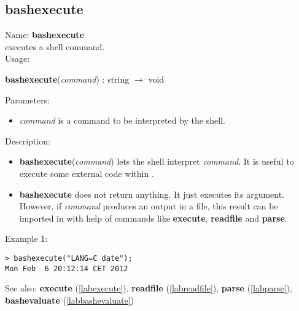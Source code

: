 \subsection{bashexecute}
\label{labbashexecute}
\noindent Name: \textbf{bashexecute}\\
executes a shell command.\\
\noindent Usage: 
\begin{center}
\textbf{bashexecute}(\emph{command}) : \textsf{string} $\rightarrow$ \textsf{void}\\
\end{center}
Parameters: 
\begin{itemize}
\item \emph{command} is a command to be interpreted by the shell.
\end{itemize}
\noindent Description: \begin{itemize}

\item \textbf{bashexecute}(\emph{command}) lets the shell interpret \emph{command}. It is useful to execute
   some external code within \sollya.

\item \textbf{bashexecute} does not return anything. It just executes its argument. However, if
   \emph{command} produces an output in a file, this result can be imported in \sollya
   with help of commands like \textbf{execute}, \textbf{readfile} and \textbf{parse}.
\end{itemize}
\noindent Example 1: 
\begin{center}\begin{minipage}{15cm}\begin{Verbatim}[frame=single]
> bashexecute("LANG=C date");
Mon Feb  6 20:12:14 CET 2012
\end{Verbatim}
\end{minipage}\end{center}
See also: \textbf{execute} (\ref{labexecute}), \textbf{readfile} (\ref{labreadfile}), \textbf{parse} (\ref{labparse}), \textbf{bashevaluate} (\ref{labbashevaluate})
